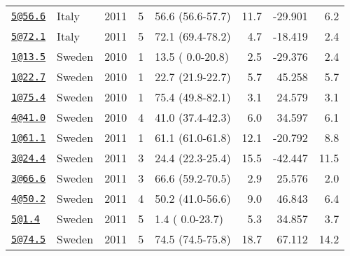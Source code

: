 \documentclass[]{article}
\begin{document}
\begin{longtable}[]{@{}llrrlrrr@{}}
\href{mailto:5@56.6}{\nolinkurl{5@56.6}} & Italy & 2011 & 5 & 56.6 (56.6-57.7) & 11.7 & -29.901 & 6.2\tabularnewline
\href{mailto:5@72.1}{\nolinkurl{5@72.1}} & Italy & 2011 & 5 & 72.1 (69.4-78.2) & 4.7 & -18.419 & 2.4\tabularnewline
\href{mailto:1@13.5}{\nolinkurl{1@13.5}} & Sweden & 2010 & 1 & 13.5 ( 0.0-20.8) & 2.5 & -29.376 & 2.4\tabularnewline
\href{mailto:1@22.7}{\nolinkurl{1@22.7}} & Sweden & 2010 & 1 & 22.7 (21.9-22.7) & 5.7 & 45.258 & 5.7\tabularnewline
\href{mailto:1@75.4}{\nolinkurl{1@75.4}} & Sweden & 2010 & 1 & 75.4 (49.8-82.1) & 3.1 & 24.579 & 3.1\tabularnewline
\href{mailto:4@41.0}{\nolinkurl{4@41.0}} & Sweden & 2010 & 4 & 41.0 (37.4-42.3) & 6.0 & 34.597 & 6.1\tabularnewline
\href{mailto:1@61.1}{\nolinkurl{1@61.1}} & Sweden & 2011 & 1 & 61.1 (61.0-61.8) & 12.1 & -20.792 & 8.8\tabularnewline
\href{mailto:3@24.4}{\nolinkurl{3@24.4}} & Sweden & 2011 & 3 & 24.4 (22.3-25.4) & 15.5 & -42.447 & 11.5\tabularnewline
\href{mailto:3@66.6}{\nolinkurl{3@66.6}} & Sweden & 2011 & 3 & 66.6 (59.2-70.5) & 2.9 & 25.576 & 2.0\tabularnewline
\href{mailto:4@50.2}{\nolinkurl{4@50.2}} & Sweden & 2011 & 4 & 50.2 (41.0-56.6) & 9.0 & 46.843 & 6.4\tabularnewline
\href{mailto:5@1.4}{\nolinkurl{5@1.4}} & Sweden & 2011 & 5 & 1.4 ( 0.0-23.7) & 5.3 & 34.857 & 3.7\tabularnewline
\href{mailto:5@74.5}{\nolinkurl{5@74.5}} & Sweden & 2011 & 5 & 74.5 (74.5-75.8) & 18.7 & 67.112 & 14.2\tabularnewline
\bottomrule
\end{longtable}

\newpage
\end{document}
